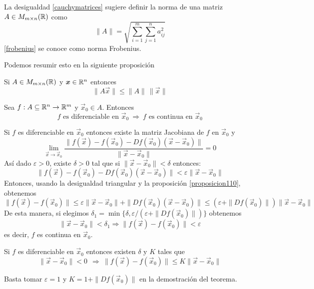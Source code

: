 \begin{definicion}
La desigualdad \ref{cauchymatrices} sugiere definir la norma de una matriz $A\in M_{m\times n}(\mathbb{R})$ como
\begin{equation}\label{frobenius}
\|A\|=\sqrt{\sum_{i=1}^m\sum_{j=1}^na_{ij}^2}
\end{equation}
\eqref{frobenius} se conoce como norma Frobenius.
\end{definicion}

Podemos resumir esto en la siguiente proposici\'on
\begin{proposicion}\label{proposicion110}
Si $A\in M_{m\times n}(\mathbb{R})$ y $\boldsymbol{x}\in\mathbb{R}^n$ entonces
$$
\|A\vec{x}\|\le \|A\|\,\| \vec{x}\|
$$
\end{proposicion}

\begin{teorema} Sea $f:A\subseteq\mathbb{R}^n\to\mathbb{R}^m$ y $\vec{x}_0\in A$. Entonces
$$f \text{ es diferenciable en } \vec{x}_0 \: \Rightarrow \: f \text{ es continua en } \vec{x}_0$$
\end{teorema}

\begin{demostracion} 
Si $f$ es diferenciable en $\vec{x}_0$ entonces 
existe la matriz Jacobiana de $f$ en $\vec{x}_0$ y
$$\lim_{\vec{x}\to \vec{x}_0}\frac{\|f(\vec{x})-f(\vec{x}_0)-Df(\vec{x}_0)(\vec{x}-\vec{x}_0)\|}{\|\vec{x}-\vec{x}_0\|}=0$$
As\'i dado $\varepsilon>0$, existe $\delta>0$ tal que si $\|\vec{x}-\vec{x}_0\|<\delta$ entonces:
$${\|f(\vec{x})-f(\vec{x}_0)-Df(\vec{x}_0)(\vec{x}-\vec{x}_0)\|}<\varepsilon{\|\vec{x}-\vec{x}_0\|}$$
Entonces, usando la desigualdad triangular y la proposici\'on \ref{proposicion110}, obtenemos
$$\|f(\vec{x})-f(\vec{x}_0)\|\leq\varepsilon\|\vec{x}-\vec{x}_0\|+\|Df(\vec{x}_0)(\vec{x}-\vec{x}_0)\|\leq
(\varepsilon+\|Df(\vec{x}_0)\|)\|\vec{x}-\vec{x}_0\|$$
De esta manera, si elegimos $\delta_1=\min\{\delta,{\varepsilon}/({\varepsilon+\|Df(\vec{x}_0)\|})\}$ obtenemos
$$\|\vec{x}-\vec{x}_0\|<\delta_1\Rightarrow\|f(\vec{x})-f(\vec{x}_0)\|<\varepsilon$$
es decir, $f$ es continua en $\vec{x}_0$.
\end{demostracion}

\begin{corolario}
Si $f$ es diferenciable en $\vec{x}_0$ entonces existen $\delta$ y $K$ tales que
$$\|\vec{x}-\vec{x}_0\|<0\ \:\Rightarrow\: \|f(\vec{x})-f(\vec{x}_0)\|\leq K\|\vec{x}-\vec{x}_0\|$$
\end{corolario}

\begin{demostracion} 
Basta tomar $\varepsilon =1$ y $K=1+\|Df(\vec{x}_0)\|$ en la demostraci\'on del teorema.  
\end{demostracion}

